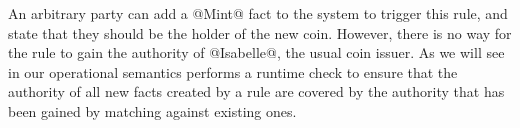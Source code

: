 An arbitrary party can add a @Mint@ fact to the system to trigger this rule, and state that they should be the holder of the new coin. However, there is no way for the rule to gain the authority of @Isabelle@, the usual coin issuer. As we will see in \REF our operational semantics performs a runtime check to ensure that the authority of all new facts created by a rule are covered by the authority that has been gained by matching against existing ones.


